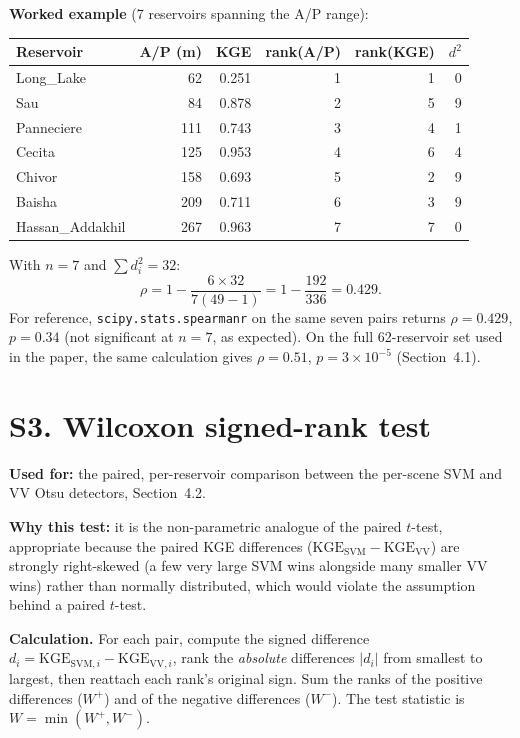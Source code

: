 \documentclass[12pt,authoryear]{elsarticle}
\begin{document}
\textbf{Worked example} (7 reservoirs spanning the A/P range):

\begin{center}
\begin{tabular}{lrrrrr}
\toprule
Reservoir & A/P (m) & KGE & rank(A/P) & rank(KGE) & $d^2$ \\
\midrule
Long\_Lake       & 62  & 0.251 & 1 & 1 & 0 \\
Sau              & 84  & 0.878 & 2 & 5 & 9 \\
Panneciere       & 111 & 0.743 & 3 & 4 & 1 \\
Cecita           & 125 & 0.953 & 4 & 6 & 4 \\
Chivor           & 158 & 0.693 & 5 & 2 & 9 \\
Baisha           & 209 & 0.711 & 6 & 3 & 9 \\
Hassan\_Addakhil & 267 & 0.963 & 7 & 7 & 0 \\
\bottomrule
\end{tabular}
\end{center}

With $n=7$ and $\sum d_i^2 = 32$:
\[
\rho = 1 - \frac{6 \times 32}{7(49-1)} = 1 - \frac{192}{336} = 0.429.
\]
For reference, \texttt{scipy.stats.spearmanr} on the same seven pairs
returns $\rho = 0.429$, $p = 0.34$ (not significant at $n=7$, as expected).
On the full 62-reservoir set used in the paper, the same calculation gives
$\rho = 0.51$, $p = 3\times10^{-5}$ (Section~4.1).

\section*{S3. Wilcoxon signed-rank test \citep{Wilcoxon1945}}

\textbf{Used for:} the paired, per-reservoir comparison between the
per-scene SVM and VV Otsu detectors, Section~4.2.

\textbf{Why this test:} it is the non-parametric analogue of the paired
$t$-test, appropriate because the paired KGE differences
($\mathrm{KGE}_{\text{SVM}} - \mathrm{KGE}_{\text{VV}}$) are strongly
right-skewed (a few very large SVM wins alongside many smaller VV wins)
rather than normally distributed, which would violate the assumption behind
a paired $t$-test.

\textbf{Calculation.} For each pair, compute the signed difference
$d_i = \mathrm{KGE}_{\mathrm{SVM},i} - \mathrm{KGE}_{\mathrm{VV},i}$, rank the
\emph{absolute} differences $|d_i|$ from smallest to largest, then reattach
each rank's original sign. Sum the ranks of the positive differences ($W^+$)
and of the negative differences ($W^-$). The test statistic is
$W = \min(W^+, W^-)$.
\end{document}
